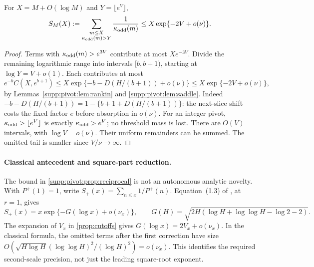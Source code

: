 \begin{proposition}\label{supp:pivot:prop:reciprocal}\label{C-PIVOT-RECIP}
For $X=M+O(\log M)$ and $Y=\lfloor e^V\rfloor$,
\begin{equation}\label{supp:pivot:eq:reciprocal}
 S_M(X):=\sum_{\substack{m\le X\\\kappa_{\rm odd}(m)>Y}}
                 \frac1{\kappa_{\rm odd}(m)}
       \le X\exp\{-2V+o(\nu)\}.
\end{equation}
\end{proposition}
\begin{proof}
Terms with $\kappa_{\rm odd}(m)>e^{3V}$ contribute at most $Xe^{-3V}$.
Divide the remaining logarithmic range into intervals $[b,b+1)$, starting at
$\log Y=V+o(1)$. Each contributes at most
\[
 e^{-b}C(X,e^{b+1})
 \le X\exp\{-b-D(H/(b+1))+o(\nu)\}
 \le X\exp\{-2V+o(\nu)\},
\]
by Lemmas~\ref{supp:pivot:lem:rankin} and \ref{supp:pivot:lem:saddle}.
Indeed $-b-D(H/(b+1))=1-\{b+1+D(H/(b+1))\}$: the next-slice
shift costs the fixed factor $e$ before absorption in $o(\nu)$.
For an integer pivot, $\kappa_{\rm odd}>\lfloor e^V\rfloor$ is
exactly $\kappa_{\rm odd}>e^V$; no threshold mass is lost. There are $O(V)$ intervals, with $\log V=o(\nu)$. Their uniform remainders can be summed. The omitted tail is smaller since $V/\nu\to\infty$.
\end{proof}

\paragraph{Classical antecedent and square-part reduction.}
The bound in \cref{supp:pivot:prop:reciprocal} is not an autonomous
analytic novelty. With $P^+(1)=1$, write
$S_+(x)=\sum_{n\le x}1/P^+(n)$.
Equation~(1.3) of \cite{ErdosIvicPomerance1986}, at $r=1$, gives
\[
 S_+(x)=x\exp\{-G(\log x)+o(\nu_x)\},\qquad
 G(H)=\sqrt{2H(\log H+\log\log H-\log2-2)}.
\]
The expansion of $V_x$ in \cref{prop:cutoffs} gives
$G(\log x)=2V_x+o(\nu_x)$. In the classical formula, the omitted
terms after the first correction have size
$O(\sqrt{H\log H}(\log\log H)^2/(\log H)^2)=o(\nu_x)$.
This identifies the required second-scale precision, not just the
leading square-root exponent.

